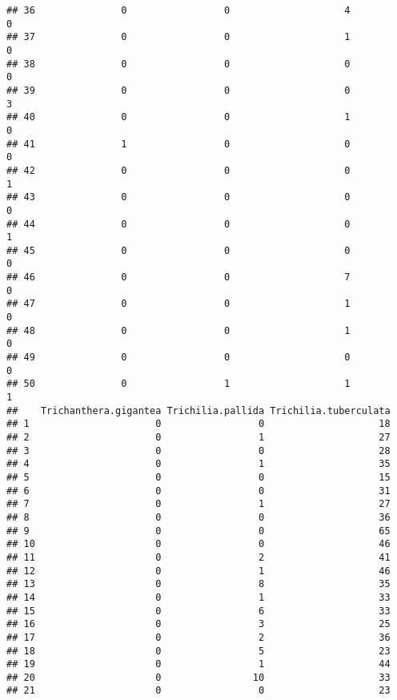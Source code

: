 \documentclass[
]{article}
\begin{document}
\begin{verbatim}
## 36               0                 0                    4               0
## 37               0                 0                    1               0
## 38               0                 0                    0               0
## 39               0                 0                    0               3
## 40               0                 0                    1               0
## 41               1                 0                    0               0
## 42               0                 0                    0               1
## 43               0                 0                    0               0
## 44               0                 0                    0               1
## 45               0                 0                    0               0
## 46               0                 0                    7               0
## 47               0                 0                    1               0
## 48               0                 0                    1               0
## 49               0                 0                    0               0
## 50               0                 1                    1               1
##    Trichanthera.gigantea Trichilia.pallida Trichilia.tuberculata
## 1                      0                 0                    18
## 2                      0                 1                    27
## 3                      0                 0                    28
## 4                      0                 1                    35
## 5                      0                 0                    15
## 6                      0                 0                    31
## 7                      0                 1                    27
## 8                      0                 0                    36
## 9                      0                 0                    65
## 10                     0                 0                    46
## 11                     0                 2                    41
## 12                     0                 1                    46
## 13                     0                 8                    35
## 14                     0                 1                    33
## 15                     0                 6                    33
## 16                     0                 3                    25
## 17                     0                 2                    36
## 18                     0                 5                    23
## 19                     0                 1                    44
## 20                     0                10                    33
## 21                     0                 0                    23

\end{verbatim}
\end{document}
